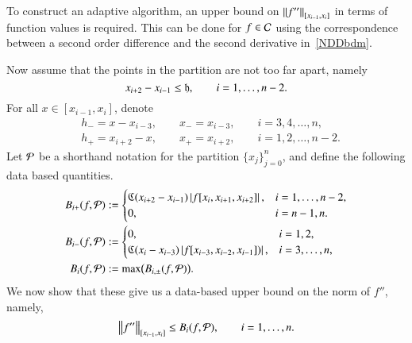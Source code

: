 \documentclass[review]{elsarticle}
\theoremstyle{definition}
\begin{document}
To construct an adaptive algorithm, an upper bound on
$\norm[{[x_{i-1},x_i]}]{f''}$ in terms of function values is required. This can be done for
$f \in \cc$ using the correspondence between a second order difference and the
second derivative in~\eqref{NDDbdm}.

Now assume that the points in the partition are not too far apart, namely
\begin{equation} \label{widthrestrict}
x_{i+2} - x_{i-1} \le \fh, \qquad i = 1, \ldots, n-2.
\end{equation}
For all $ x \in [x_{i-1},x_i]$,  denote
\begin{align*}
&h_- = x - x_{i-3}, \qquad x_- = x_{i-3},  \qquad i=3,4,\ldots,n,\\
 &h_+ = x_{i+2} - x, \qquad x_+ =  x_{i+2}, \qquad i=1,2,\ldots,n-2.
\end{align*}
Let $\cp$ be a shorthand notation for the partition $\{x_j\}_{j=0}^n$, and define the following data based quantities.
\begin{subequations} \label{bpdef}
\begin{align}\label{bpf}
B_{i+}(f,\cp)&:=\begin{cases}
\fC(x_{i+2}-x_{i-1})\abs{f[x_i,x_{i+1},x_{i+2}]},  & i=1,\ldots,n-2,
\\ 0, & i=n-1,n.
\end{cases} \\
\label{bmf}
B_{i-}(f,\cp)&: =\begin{cases}
0,  & i=1,2,
\\ \fC(x_{i}-x_{i-3})\abs{f[x_{i-3},x_{i-2},x_{i-1}])}, & i=3,\ldots,n,
\end{cases} \\
\nonumber
B_i(f,\cp) & : = \max\bigl(B_{i,\pm}(f,\cp) \bigr).
\end{align}
\end{subequations}
We now show that these give us a data-based upper bound on the norm of $f''$, namely,
\begin{equation}\label{normbd}
\norm[{[x_{i-1},x_i]}]{f''} \le B_i(f,\cp), \qquad i =1, \ldots, n.
\end{equation}
\end{document}
